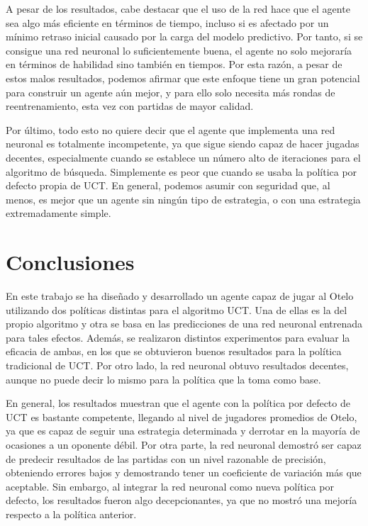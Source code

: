 \documentclass[conference,a4paper]{IEEEtran}
\begin{document}
A pesar de los resultados, cabe destacar que el uso de la red hace que el agente sea algo más eficiente en términos de tiempo, 
incluso si es afectado por un mínimo retraso inicial causado por la carga del modelo predictivo. Por tanto, si se consigue una red neuronal lo suficientemente buena, 
el agente no solo mejoraría en términos de habilidad sino también en tiempos. Por esta razón, a pesar de estos malos resultados, podemos afirmar que este enfoque 
tiene un gran potencial para construir un agente aún mejor, y para ello solo necesita más rondas de reentrenamiento, esta vez con partidas de mayor calidad.

Por último, todo esto no quiere decir que el agente que implementa una red neuronal es totalmente incompetente, ya que sigue siendo capaz de hacer jugadas decentes, 
especialmente cuando se establece un número alto de iteraciones para el algoritmo de búsqueda. Simplemente es peor que cuando se usaba la política por defecto propia de UCT. 
En general, podemos asumir con seguridad que, al menos, es mejor que un agente sin ningún tipo de estrategia, o con una estrategia extremadamente simple.

\section{Conclusiones}

En este trabajo se ha diseñado y desarrollado un agente capaz de jugar al Otelo utilizando dos políticas distintas para el algoritmo UCT. 
Una de ellas es la del propio algoritmo y otra se basa en las predicciones de una red neuronal entrenada para tales efectos. Además, 
se realizaron distintos experimentos para evaluar la eficacia de ambas, en los que se obtuvieron buenos resultados para la política 
tradicional de UCT. Por otro lado, la red neuronal obtuvo resultados decentes, aunque no puede decir lo mismo para la política que la toma como base.

En general, los resultados muestran que el agente con la política por defecto de UCT es bastante competente, llegando al nivel de jugadores promedios de Otelo, 
ya que es capaz de seguir una estrategia determinada y derrotar en la mayoría de ocasiones a un oponente débil. Por otra parte, la red neuronal demostró ser 
capaz de predecir resultados de las partidas con un nivel razonable de precisión, obteniendo errores bajos y demostrando tener un coeficiente de variación más que aceptable. 
Sin embargo, al integrar la red neuronal como nueva política por defecto, los resultados fueron algo decepcionantes, ya que no mostró una mejoría respecto a la política anterior.
\end{document}
